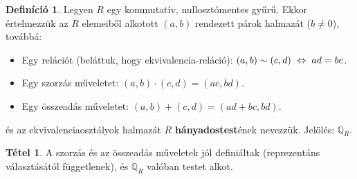 \documentclass[12pt]{book}
\theoremstyle{plain} %
\theoremstyle{definition} %
\newtheorem{defi/}{Definíció}[section]
\newenvironment{defi}
  {\renewcommand{\qedsymbol}{$\clubsuit$}%
   \pushQED{\qed}\begin{defi/}}
  {\popQED\end{defi/}}
\newtheorem{theo/}{Tétel}[section]
\newenvironment{theo}
  {\renewcommand{\qedsymbol}{$\clubsuit$}%
   \pushQED{\qed}\begin{theo/}}
  {\popQED\end{theo/}}
\theoremstyle{remark}
\renewcommand\qedsymbol{$\blacksquare$}
\numberwithin{equation}{section}  %
\begin{document}

	\begin{defi}
		Legyen $R$ egy kommutatív, nullosztómentes gyűrű. Ekkor értelmezzük az $R$ elemeiből alkotott $(a,b)$ rendezett párok halmazát ($b\neq 0$), továbbá:
		\begin{itemize}
			\item Egy relációt (beláttuk, hogy ekvivalencia-reláció): $(a,b) \sim (c,d) \hspace{1mm} \Leftrightarrow \hspace{1mm} ad=bc$.
			\item Egy szorzás műveletet: $(a,b)\cdot (c,d) = (ac,bd)$.
			\item Egy összeadás műveletet: $(a,b)+(c,d)=(ad+bc,bd)$.
		\end{itemize}
		és az ekvivalenciaosztályok halmazát $R$ \textbf{hányadostest}ének nevezzük. Jelölés: $\mathbb{Q}_R$.
	\end{defi}
	
	\begin{theo}
		A szorzás és az összeadás műveletek jól definiáltak (reprezentáns választásától függetlenek), és $\mathbb{Q}_R$ valóban testet alkot.
	\end{theo}
\end{document}
